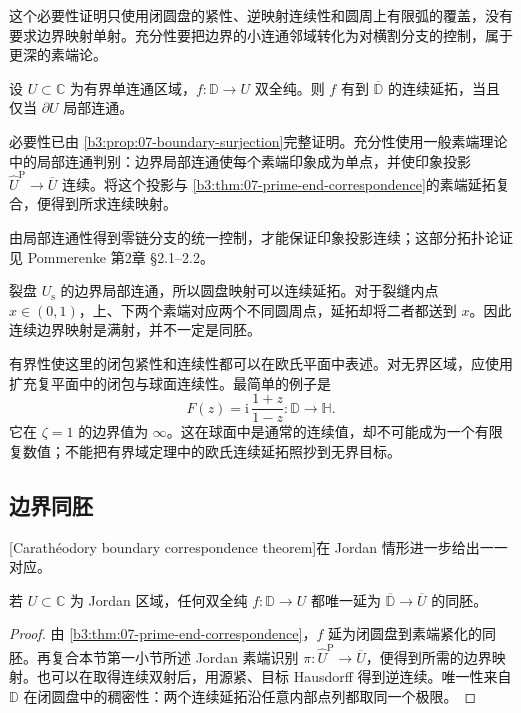 这个必要性证明只使用闭圆盘的紧性、逆映射连续性和圆周上有限弧的覆盖，没有要求边界映射单射。充分性要把边界的小连通邻域转化为对横割分支的控制，属于更深的素端论。

\begin{theorem}[深层连续延拓判别]\label{b3:thm:07-continuous-extension}
设 \(U\subset\mathbb C\) 为有界单连通区域，\(f:\mathbb D\rightarrow U\) 双全纯。则 \(f\) 有到 \(\overline{\mathbb D}\) 的连续延拓，当且仅当 \(\partial U\) 局部连通。
\end{theorem}
\begin{proofsketch}
必要性已由 \cref{b3:prop:07-boundary-surjection}完整证明。充分性使用一般素端理论中的局部连通判别：边界局部连通使每个素端印象成为单点，并使印象投影
\(\widehat U^{\mathrm P}\to\overline U\) 连续。将这个投影与 \cref{b3:thm:07-prime-end-correspondence}的素端延拓复合，便得到所求连续映射。

由局部连通性得到零链分支的统一控制，才能保证印象投影连续；这部分拓扑论证见 Pommerenke 第2章 \S2.1--2.2\cite[pp. 18--19]{Pommerenke1992Boundary}。
\end{proofsketch}

裂盘 \(U_{\mathrm s}\) 的边界局部连通，所以圆盘映射可以连续延拓。对于裂缝内点 \(x\in(0,1)\)，上、下两个素端对应两个不同圆周点，延拓却将二者都送到 \(x\)。因此连续边界映射是满射，并不一定是同胚。

\ProseParagraphBreak

有界性使这里的闭包紧性和连续性都可以在欧氏平面中表述。对无界区域，应使用扩充复平面中的闭包与球面连续性。最简单的例子是
\[
 F(z)=\mathrm i\,\frac{1+z}{1-z}:\mathbb D\longrightarrow\mathbb H.
\]
它在 \(\zeta=1\) 的边界值为 \(\infty\)。这在球面中是通常的连续值，却不可能成为一个有限复数值；不能把有界域定理中的欧氏连续延拓照抄到无界目标。

\subsection{边界同胚}
\label{b3:subsec:070203}

[Carathéodory boundary correspondence theorem]在 Jordan 情形进一步给出一一对应。

\begin{theorem}\label{b3:thm:07-caratheodory-jordan}
若 \(U\subset\mathbb C\) 为 Jordan 区域，任何双全纯 \(f:\mathbb D\rightarrow U\) 都唯一延为 \(\overline{\mathbb D}\rightarrow\overline U\) 的同胚。
\end{theorem}
\begin{proof}
由 \cref{b3:thm:07-prime-end-correspondence}，\(f\) 延为闭圆盘到素端紧化的同胚。再复合本节第一小节所述 Jordan 素端识别
\(\pi:\widehat U^{\mathrm P}\to\overline U\)，便得到所需的边界映射。也可以在取得连续双射后，用源紧、目标 Hausdorff 得到逆连续。唯一性来自 \(\mathbb D\) 在闭圆盘中的稠密性：两个连续延拓沿任意内部点列都取同一个极限。
\end{proof}

